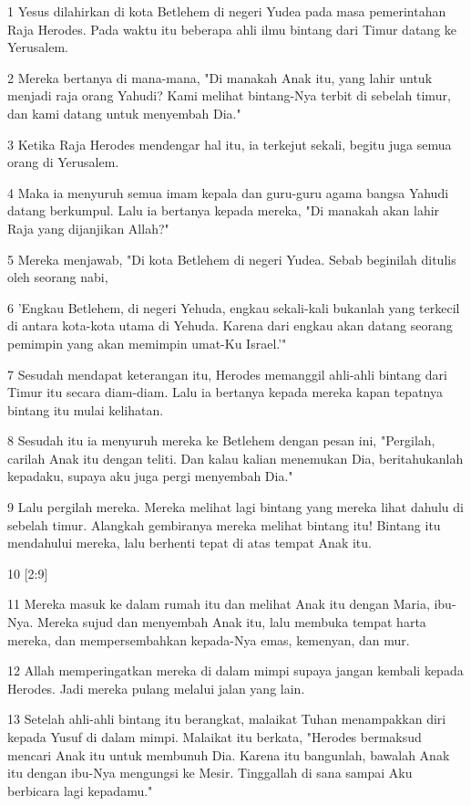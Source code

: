 \par 1 Yesus dilahirkan di kota Betlehem di negeri Yudea pada masa pemerintahan Raja Herodes. Pada waktu itu beberapa ahli ilmu bintang dari Timur datang ke Yerusalem.
\par 2 Mereka bertanya di mana-mana, "Di manakah Anak itu, yang lahir untuk menjadi raja orang Yahudi? Kami melihat bintang-Nya terbit di sebelah timur, dan kami datang untuk menyembah Dia."
\par 3 Ketika Raja Herodes mendengar hal itu, ia terkejut sekali, begitu juga semua orang di Yerusalem.
\par 4 Maka ia menyuruh semua imam kepala dan guru-guru agama bangsa Yahudi datang berkumpul. Lalu ia bertanya kepada mereka, "Di manakah akan lahir Raja yang dijanjikan Allah?"
\par 5 Mereka menjawab, "Di kota Betlehem di negeri Yudea. Sebab beginilah ditulis oleh seorang nabi,
\par 6 'Engkau Betlehem, di negeri Yehuda, engkau sekali-kali bukanlah yang terkecil di antara kota-kota utama di Yehuda. Karena dari engkau akan datang seorang pemimpin yang akan memimpin umat-Ku Israel.'"
\par 7 Sesudah mendapat keterangan itu, Herodes memanggil ahli-ahli bintang dari Timur itu secara diam-diam. Lalu ia bertanya kepada mereka kapan tepatnya bintang itu mulai kelihatan.
\par 8 Sesudah itu ia menyuruh mereka ke Betlehem dengan pesan ini, "Pergilah, carilah Anak itu dengan teliti. Dan kalau kalian menemukan Dia, beritahukanlah kepadaku, supaya aku juga pergi menyembah Dia."
\par 9 Lalu pergilah mereka. Mereka melihat lagi bintang yang mereka lihat dahulu di sebelah timur. Alangkah gembiranya mereka melihat bintang itu! Bintang itu mendahului mereka, lalu berhenti tepat di atas tempat Anak itu.
\par 10 [2:9]
\par 11 Mereka masuk ke dalam rumah itu dan melihat Anak itu dengan Maria, ibu-Nya. Mereka sujud dan menyembah Anak itu, lalu membuka tempat harta mereka, dan mempersembahkan kepada-Nya emas, kemenyan, dan mur.
\par 12 Allah memperingatkan mereka di dalam mimpi supaya jangan kembali kepada Herodes. Jadi mereka pulang melalui jalan yang lain.
\par 13 Setelah ahli-ahli bintang itu berangkat, malaikat Tuhan menampakkan diri kepada Yusuf di dalam mimpi. Malaikat itu berkata, "Herodes bermaksud mencari Anak itu untuk membunuh Dia. Karena itu bangunlah, bawalah Anak itu dengan ibu-Nya mengungsi ke Mesir. Tinggallah di sana sampai Aku berbicara lagi kepadamu."

